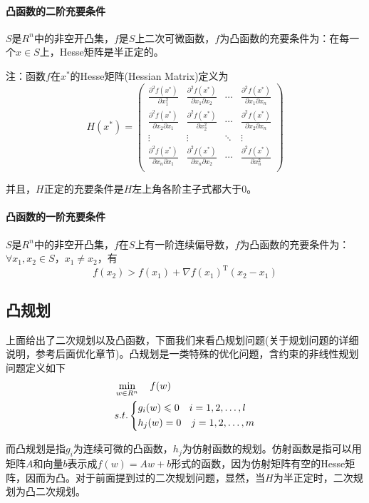 		\paragraph{凸函数的二阶充要条件}
		$S$是$R^n$中的非空开凸集，$f$是$S$上二次可微函数，$f$为凸函数的充要条件为：在每一个$x\in S$上，Hesse矩阵是半正定的。
		\par
		注：函数$f$在$x^*$的Hesse矩阵(Hessian Matrix)定义为
		\[
		H(x^*)=\begin{pmatrix}
		\frac{\partial ^2f(x^*)}{\partial x_1^2} & \frac{\partial ^2f(x^*)}{\partial x_1\partial x_2} & \cdots & \frac{\partial ^2f(x^*)}{\partial x_1\partial x_n} \\

		\frac{\partial ^2f(x^*)}{\partial x_2\partial x_1} & \frac{\partial ^2f(x^*)}{\partial x_2^2} & \cdots & \frac{\partial ^2f(x^*)}{\partial x_2\partial x_n} \\

		\vdots & \vdots & \ddots & \vdots\\

		\frac{\partial ^2f(x^*)}{\partial x_n\partial x_1} & \frac{\partial ^2f(x^*)}{\partial x_n\partial x_2} & \cdots & \frac{\partial ^2f(x^*)}{\partial x_n^2} \\
		\end{pmatrix}
		\]
		\par
		并且，$H$正定的充要条件是$H$左上角各阶主子式都大于0。
		\paragraph{凸函数的一阶充要条件}
		$S$是$R^n$中的非空开凸集，$f$在$S$上有一阶连续偏导数，$f$为凸函数的充要条件为：$\forall x_1,x_2\in S$，$x_1 \neq x_2$，有
		\[
		f(x_2)>f(x_1)+\nabla f(x_1)^\mathrm{T}(x_2-x_1)
		\]

	\subsection{凸规划}
		\par
		上面给出了二次规划以及凸函数，下面我们来看凸规划问题(关于规划问题的详细说明，参考后面优化章节)。凸规划是一类特殊的优化问题，含约束的非线性规划问题定义如下
		\begin{align*}
		& \min_{w\in R^n}\quad f(w)\\
		& s.t. \left\{
		\begin{aligned}
		& g_i(w) \leqslant 0\quad i=1,2,\dots ,l \notag\\
		& h_j(w) = 0\quad j=1,2,\dots ,m \notag
		\end{aligned}
		\right.
		\end{align*}
		\par
		而凸规划是指$g_i$为连续可微的凸函数，$h_j$为仿射函数的规划。仿射函数是指可以用矩阵$A$和向量$b$表示成$f(w)=Aw+b$形式的函数，因为仿射矩阵有空的Hesse矩阵，因而为凸。对于前面提到过的二次规划问题，显然，当$H$为半正定时，二次规划为凸二次规划。

